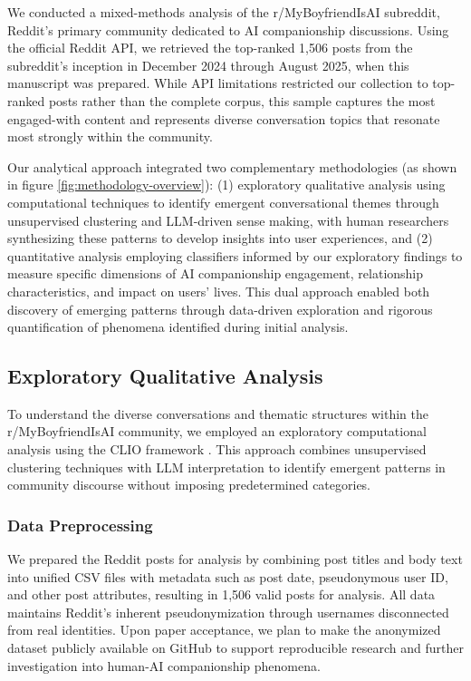 \documentclass[sigconf, nonacm]{acmart}
\begin{document}
We conducted a mixed-methods analysis of the r/MyBoyfriendIsAI subreddit, Reddit's primary community dedicated to AI companionship discussions. Using the official Reddit API, we retrieved the top-ranked 1,506 posts from the subreddit's inception in December 2024 through August 2025, when this manuscript was prepared. While API limitations restricted our collection to top-ranked posts rather than the complete corpus, this sample captures the most engaged-with content and represents diverse conversation topics that resonate most strongly within the community.

Our analytical approach integrated two complementary methodologies (as shown in figure \ref{fig:methodology-overview}): (1) exploratory qualitative analysis using computational techniques to identify emergent conversational themes through unsupervised clustering and LLM-driven sense making, with human researchers synthesizing these patterns to develop insights into user experiences, and (2) quantitative analysis employing classifiers informed by our exploratory findings to measure specific dimensions of AI companionship engagement, relationship characteristics, and impact on users' lives. This dual approach enabled both discovery of emerging patterns through data-driven exploration and rigorous quantification of phenomena identified during initial analysis.

\subsection{Exploratory Qualitative Analysis}
To understand the diverse conversations and thematic structures within the r/MyBoyfriendIsAI community, we employed an exploratory computational analysis using the CLIO framework \cite{tamkin2024clio}. This approach combines unsupervised clustering techniques with LLM interpretation to identify emergent patterns in community discourse without imposing predetermined categories.

\subsubsection{Data Preprocessing}
We prepared the Reddit posts for analysis by combining post titles and body text into unified CSV files with metadata such as post date, pseudonymous user ID, and other post attributes, resulting in 1,506 valid posts for analysis. All data maintains Reddit's inherent pseudonymization through usernames disconnected from real identities. Upon paper acceptance, we plan to make the anonymized dataset publicly available on GitHub to support reproducible research and further investigation into human-AI companionship phenomena.
\end{document}
